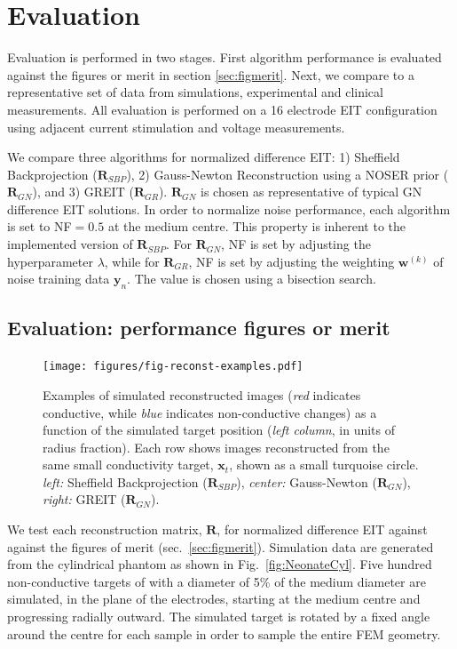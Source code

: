 \documentclass[12pt]{iopart}
\newcommand{\xB}{\mbox{$\mathbf{x}$}}
\newcommand{\yB}{\mbox{$\mathbf{y}$}}
\newcommand{\wB}{\mbox{$\mathbf{w}$}}
\newcommand{\RB}{\mbox{$\mathbf{R}$}}
\begin{document}
\section{Evaluation}

Evaluation is performed in two stages. First algorithm performance
is evaluated against the figures or merit in section
\ref{sec:figmerit}.
Next, we compare to a representative set of data
from simulations, experimental and clinical measurements.
All evaluation is performed on a 16 electrode EIT configuration
using adjacent current stimulation and voltage measurements.

We compare three algorithms for normalized
difference EIT:
1) Sheffield Backprojection
    ($\RB_{SBP}$), 
2) Gauss-Newton Reconstruction using a
   NOSER prior
    ($\RB_{GN}$), 
and
3) GREIT ($\RB_{GR}$). 
$\RB_{GN}$ is chosen as representative
of typical GN difference EIT solutions.
 In order to normalize
noise performance, each algorithm is set to
NF$=0.5$ at the medium centre. This property
is inherent to the implemented version
of $\RB_{SBP}$. 
For $\RB_{GN}$, NF is set by 
adjusting the hyperparameter $\lambda$, while
for $\RB_{GR}$, NF is set by 
adjusting the weighting $\wB^{(k)}$ of noise
training data $\yB_n$. The value is chosen using
a bisection search.


\subsection{Evaluation: performance figures or merit}
\label{sec:perffigm}

\begin{figure}[bhtp]
\begin{center}
\texttt{[image: figures/fig-reconst-examples.pdf]}
\caption{
\label{fig:FoMimages}
Examples of simulated reconstructed images
({\em red} indicates conductive, while
 {\em blue} indicates non-conductive changes)
 as a function of the simulated target position
({\em left column}, in units of radius fraction). Each row
shows images reconstructed from the same small 
conductivity target, $\xB_t$, shown as 
a small turquoise circle.
{\em left:} Sheffield Backprojection ($\RB_{SBP}$),
{\em center:} Gauss-Newton ($\RB_{GN}$),
{\em right:} GREIT ($\RB_{GN}$).
}
\end{center}
\end{figure}

We test each reconstruction matrix, $\RB$,
for normalized difference EIT
against against the figures of merit 
(sec.\ \ref{sec:figmerit}). Simulation data
are generated from the cylindrical phantom
as shown in Fig.\ \ref{fig:NeonateCyl}. 
Five hundred 
non-conductive targets of with a diameter of
5\% of the medium diameter are simulated,
 in the plane of the electrodes,
starting at the medium centre and 
progressing radially outward. The simulated 
target is rotated by a fixed angle around the centre
for each sample in order to sample the entire
FEM geometry.
\end{document}
